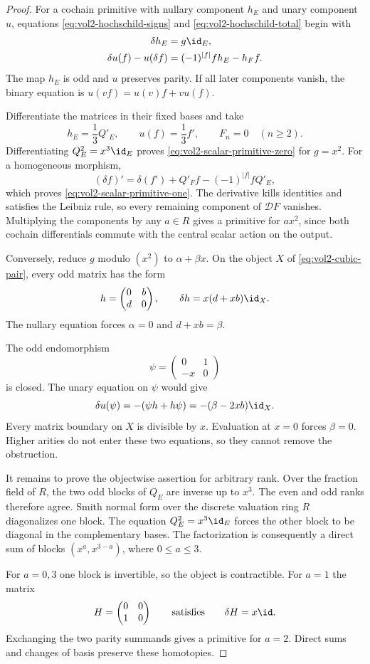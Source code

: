 \begin{proof}
For a cochain primitive with nullary component $h_E$ and unary
component $u$, equations \eqref{eq:vol2-hochschild-signs} and
\eqref{eq:vol2-hochschild-total} begin with
\begin{align}
 \delta h_E&=g\id_E,\label{eq:vol2-scalar-primitive-zero}\\
 \delta u(f)-u(\delta f)
 &=(-1)^{|f|}fh_E-h_Ff.
 \label{eq:vol2-scalar-primitive-one}
\end{align}
The map $h_E$ is odd and $u$ preserves parity.
If all later components vanish, the binary equation is
$u(vf)=u(v)f+vu(f)$.

Differentiate the matrices in their fixed bases and take
\[
 h_E=\frac13Q'_E,
 \qquad u(f)=\frac13f',
 \qquad F_n=0\quad(n\ge2).
\]
Differentiating $Q_E^2=x^3\id_E$ proves
\eqref{eq:vol2-scalar-primitive-zero} for $g=x^2$.
For a homogeneous morphism,
\[
 (\delta f)'=\delta(f')+Q'_Ff-(-1)^{|f|}fQ'_E,
\]
which proves \eqref{eq:vol2-scalar-primitive-one}.
The derivative kills identities and satisfies the Leibniz rule,
so every remaining component of $\mathcal DF$ vanishes.
Multiplying the components by any $a\in R$ gives a primitive
for $ax^2$, since both cochain differentials commute with the
central scalar action on the output.

Conversely, reduce $g$ modulo $(x^2)$ to $\alpha+\beta x$.
On the object $X$ of \eqref{eq:vol2-cubic-pair}, every odd
matrix has the form
\[
 h=\begin{pmatrix}0&b\\d&0\end{pmatrix},
 \qquad \delta h=x(d+xb)\id_X.
\]
The nullary equation forces $\alpha=0$ and $d+xb=\beta$.

The odd endomorphism
\[
 \psi=\begin{pmatrix}0&1\\-x&0\end{pmatrix}
\]
is closed. The unary equation on $\psi$ would give
\[
 \delta u(\psi)=-(\psi h+h\psi)=-(\beta-2xb)\id_X.
\]
Every matrix boundary on $X$ is divisible by $x$.
Evaluation at $x=0$ forces $\beta=0$. Higher arities do not
enter these two equations, so they cannot remove the obstruction.

It remains to prove the objectwise assertion for arbitrary rank.
Over the fraction field of $R$, the two odd blocks of $Q_E$
are inverse up to $x^3$. The even and odd ranks therefore agree.
Smith normal form over the discrete valuation ring $R$
diagonalizes one block. The equation $Q_E^2=x^3\id_E$ forces
the other block to be diagonal in the complementary bases.
The factorization is consequently a direct sum of blocks
$(x^a,x^{3-a})$, where $0\le a\le3$.

For $a=0,3$ one block is invertible, so the object is contractible.
For $a=1$ the matrix
\[
 H=\begin{pmatrix}0&0\\1&0\end{pmatrix}
 \qquad\text{satisfies}\qquad \delta H=x\id.
\]
Exchanging the two parity summands gives a primitive for $a=2$.
Direct sums and changes of basis preserve these homotopies.
\end{proof}

